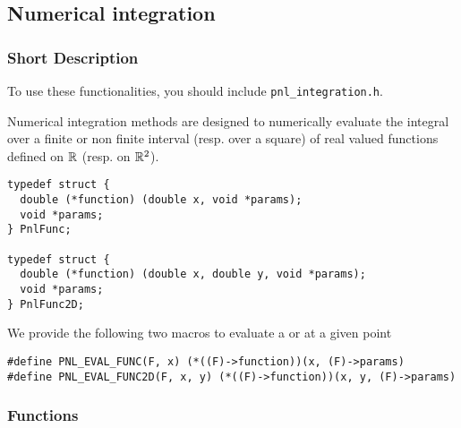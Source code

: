 \subsection{Numerical integration}
\subsubsection{Short Description}

To use these functionalities, you should include \verb!pnl_integration.h!.

Numerical integration methods are designed to numerically evaluate the integral
over a finite or non finite interval (resp. over a square) of real valued
functions defined on ${\mathbb R}$ (resp. on ${\mathbb R}^2$).

\begin{verbatim}
typedef struct {
  double (*function) (double x, void *params);
  void *params;
} PnlFunc;

typedef struct {
  double (*function) (double x, double y, void *params);
  void *params;
} PnlFunc2D;
\end{verbatim}

We provide the following two macros to evaluate a  or
 at a given point
\begin{verbatim}
#define PNL_EVAL_FUNC(F, x) (*((F)->function))(x, (F)->params)
#define PNL_EVAL_FUNC2D(F, x, y) (*((F)->function))(x, y, (F)->params)
\end{verbatim}



\subsubsection{Functions}


